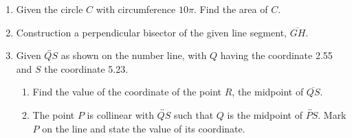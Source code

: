 \documentclass[12pt, oneside]{article}
\begin{document}
\begin{enumerate}
\newpage
  \item Given the circle $C$ with circumference $10\pi$. Find the area of $C$. \vspace{5cm}

  \item Construction a perpendicular bisector of the given line segment, $\overline{GH}$.\\
    \vspace{4cm}
    \begin{center}
    \end{center}

\newpage
  \item Given $\overleftrightarrow{QS}$ as shown on the number line, with $Q$ having the coordinate 2.55 and $S$ the coordinate 5.23. \\[20pt] %
     \bigskip
    \begin{enumerate}
      \item Find the value of the coordinate of the point $R$, the midpoint of $\overline{QS}$. \vspace{4cm}
      \item The point $P$ is collinear with $\overleftrightarrow{QS}$ such that $Q$ is the midpoint of $\overleftrightarrow{PS}$. Mark $P$ on the line and state the value of its coordinate.
    \end{enumerate}\vspace{4cm}


\end{enumerate}
\end{document}
